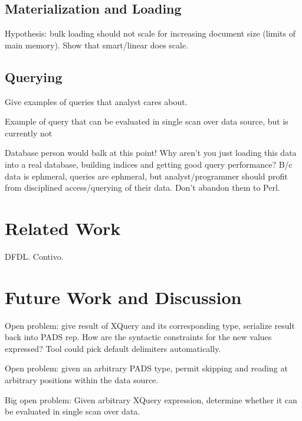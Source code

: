 \documentclass{sigplanconf}
\begin{document}
\subsection{Materialization and Loading}

Hypothesis: bulk loading should not scale for increasing document size
(limits of main memory).  Show that smart/linear does scale.

\subsection{Querying}

Give examples of queries that analyst cares about. 

Example of query that can be evaluated in single scan over data
source, but is currently not 

Database person would balk at this point!  Why aren't you just loading
this data into a real database, building indices and getting good
query performance?  B/c data is ephmeral, queries are ephmeral, but
analyst/programmer should profit from disciplined access/querying of
their data.  Don't abandon them to Perl. 

\section{Related Work}
\label{section:relatedwork}

DFDL. Contivo. 

\section{Future Work and Discussion}
\label{section:future}
Open problem: give result of XQuery and its corresponding type,
serialize result back into PADS rep.  How are the syntactic
constraints for the new values expressed?  Tool could pick default
delimiters automatically. 

Open problem: given an arbitrary PADS type, permit skipping and
reading at arbitrary positions within the data source. 

Big open problem: Given arbitrary XQuery expression, determine whether
it can be evaluated in single scan over data.  


\small
 
\end{document}
